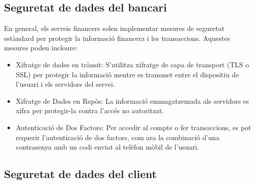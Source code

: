 



\subsection*{Seguretat de dades del bancari}


En general, els serveis financers solen implementar mesures de seguretat estàndard per protegir la informació financera i les transaccions. Aquestes mesures poden incloure:

\begin{itemize}
    \item Xifratge de dades en trànsit: S'utilitza xifratge de capa de transport (TLS o SSL) per protegir la informació mentre es transmet entre el dispositiu de l'usuari i els servidors del servei.
    \item Xifratge de Dades en Repòs: La informació emmagatzemada als servidors es xifra per protegir-la contra l'accés no autoritzat.
    \item Autenticació de Dos Factors: Per accedir al compte o fer transaccions, es pot requerir l'autenticació de dos factors, com ara la combinació d'una contrasenya amb un codi enviat al telèfon mòbil de l'usuari.
\end{itemize}

\subsection*{Seguretat de dades del client}


